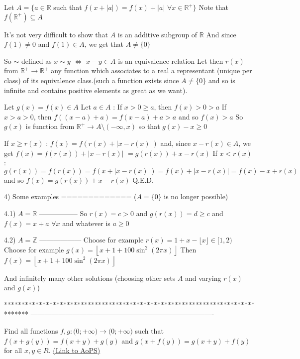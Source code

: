 \begin{solution}
Let $A=\{a\in\mathbb R$ such that $f(x+|a|)=f(x)+|a|$ $\forall x\in\mathbb R^+\}$
Note that $f(\mathbb R^+)\subseteq A$

It's not very difficult to show that $A$ is an additive subgroup of $\mathbb R$
And since $f(1)\ne 0$ and $f(1)\in A$, we get that $A\ne \{0\}$

So $\sim$ defined as $x\sim y$ $\iff$ $x-y\in A$ is an equivalence relation
Let then $r(x)$ from $\mathbb R^+\to\mathbb R^+$ any function which associates to a real a representant (unique per class) of its equivalence class.(such a function exists since $A\ne\{0\}$ and so is infinite and contains positive elements as great as we want).

Let $g(x)=f(x)\in A$
Let $a\in A$ :
If $x>0\ge a$, then $f(x)>0>a$
If $x>a>0$, then $f((x-a)+a)=f(x-a)+a>a$ and so $f(x)>a$
So $g(x)$ is function from $\mathbb R^+\to A\setminus(-\infty,x)$ so that $g(x)-x\ge 0$

If $x\ge r(x)$ : $f(x)=f(r(x)+|x-r(x)|)$ and, since $x-r(x)\in A$, we get $f(x)=f(r(x))+|x-r(x)|$ $=g(r(x))+x-r(x)$
If $x<r(x)$ : $g(r(x))=f(r(x))=f(x+|x-r(x)|)=f(x)+|x-r(x)|=f(x)-x+r(x)$ and so $f(x)=g(r(x))+x-r(x)$
Q.E.D.

4) Some examples
=============
($A=\{0\}$ is no longer possible)

4.1) $A=\mathbb R$
-----------------
So $r(x)=c>0$ and $g(r(x))=d\ge c$ and $\boxed{f(x)=x+a}$ $\forall x$ and whatever is $a\ge 0$

4.2) $A=\mathbb Z$
------------------
Choose for example $r(x)=1+x-\lfloor x\rfloor\in[1,2)$
Choose for example $g(x)=\left\lfloor x+1+100\sin^2(2\pi x)\right\rfloor$
Then $\boxed{f(x)=\left\lfloor x+1+ 100\sin^2(2\pi x)\right\rfloor}$

And infinitely many other solutions (choosing other sets $A$ and varying $r(x)$ and $g(x)$)
\end{solution}
*******************************************************************************
-------------------------------------------------------------------------------

\begin{problem}
	Find all functions ${{f,g: \mathbb(0;+\infty)}\to\mathbb(0;+\infty)}$ such that  $f(x+g(y))=f(x+y)+g(y)$ and $g(x+f(y))=g(x+y)+f(y)$ for all $x,y{\in}R$.
	\flushright \href{https://artofproblemsolving.com/community/c6h545187}{(Link to AoPS)}
\end{problem}



